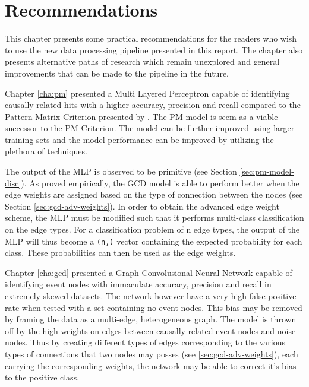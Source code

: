 
\chapter{Recommendations} %

% 

This chapter presents some practical recommendations for the readers
who wish to use the new data processing pipeline presented in this
report. The chapter also presents alternative paths of research which
remain unexplored and general improvements that can be made to the
pipeline in the future.

Chapter \ref{cha:pm} presented a Multi Layered Perceptron capable of
identifying causally related hits with a higher accuracy, precision
and recall compared to the Pattern Matrix Criterion presented by
\citeauthor{karas2019data}. The PM model is seem as a viable successor
to the PM Criterion. The model can be further improved using larger
training sets and the model performance can be improved by utilizing
the plethora of techniques.

The output of the MLP is observed to be primitive (see Section
\ref{sec:pm-model-disc}). As proved empirically, the GCD model is able
to perform better when the edge weights are assigned based on the type
of connection between the nodes (see Section
\ref{sec:gcd-adv-weights}). In order to obtain the advanced edge
weight scheme, the MLP must be modified such that it performs
multi-class classification on the edge types. For a classification
problem of n edge types, the output of the MLP will thus become a
\texttt{(n,)} vector containing the expected probability for each
class. These probabilities can then be used as the edge weights.

Chapter \ref{cha:gcd} presented a Graph Convolusional Neural Network
capable of identifying event nodes with immaculate accuracy, precision
and recall in extremely skewed datasets. The network however have a
very high false positive rate when tested with a set containing no
event nodes. This bias may be removed by framing the data as a
multi-edge, heterogeneous graph. The model is thrown off by the high
weights on edges between causally related event nodes and noise nodes.
Thus by creating different types of edges corresponding to the various
types of connections that two nodes may posses (see
\ref{sec:gcd-adv-weights}), each carrying the corresponding weights,
the network may be able to correct it's bias to the positive class.

